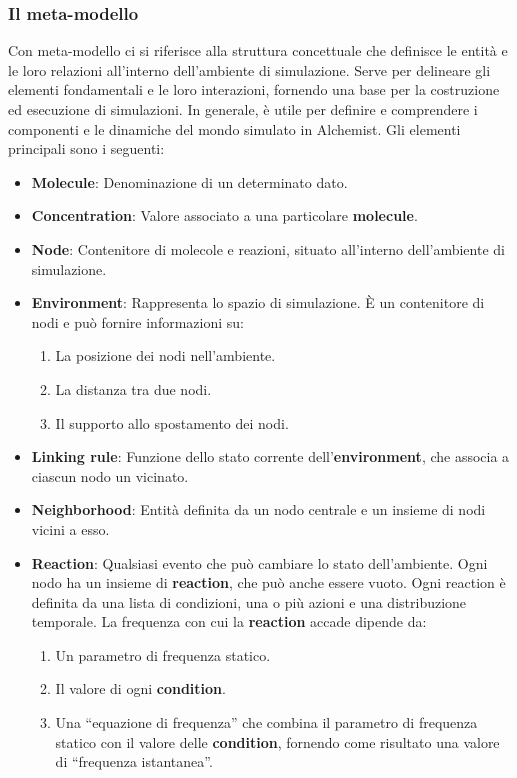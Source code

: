 \subsubsection{Il meta-modello}
Con meta-modello ci si riferisce alla struttura concettuale che definisce le entità e le loro relazioni all'interno dell'ambiente di simulazione. Serve per delineare gli elementi fondamentali e le loro interazioni, fornendo una base per la costruzione ed esecuzione di simulazioni. In generale, è utile per definire e comprendere i componenti e le dinamiche del mondo simulato in Alchemist. Gli elementi principali sono i seguenti:

\begin{itemize}
	\item \textbf{Molecule}:  Denominazione di un determinato dato.
	\item \textbf{Concentration}:  Valore associato a una particolare \textbf{molecule}. 
	\item \textbf{Node}: Contenitore di molecole e reazioni, situato all'interno dell'ambiente di simulazione.
	\item \textbf{Environment}: Rappresenta lo spazio di simulazione. È un contenitore di nodi e può fornire informazioni su:
	\begin{enumerate}
		\item La posizione dei nodi nell'ambiente.
		\item La distanza tra due nodi.
		\item Il supporto allo spostamento dei nodi.
	\end{enumerate}
	\item \textbf{Linking rule}: Funzione dello stato corrente dell'\textbf{environment}, che associa a ciascun nodo un vicinato.
	\item \textbf{Neighborhood}: Entità definita da un nodo centrale e un insieme di nodi vicini a esso.
	\item \textbf{Reaction}\label{item:reactions}: Qualsiasi evento che può cambiare lo stato dell'ambiente. Ogni nodo ha un insieme di \textbf{reaction}, che può anche essere vuoto. Ogni reaction è definita da una lista di condizioni, una o più azioni e una distribuzione temporale. La frequenza con cui la \textbf{reaction} accade dipende da:
		\begin{enumerate}
		\item Un parametro di frequenza statico.
		\item Il valore di ogni \textbf{condition}.
		\item Una ``equazione di frequenza'' che combina il parametro di frequenza statico con il valore delle \textbf{condition}, fornendo come risultato una valore di ``frequenza istantanea''.

\end{enumerate}
\end{itemize}
